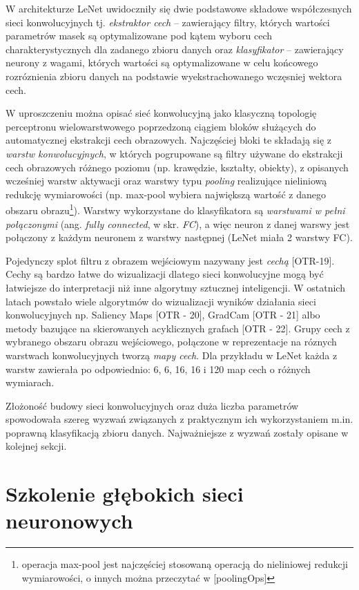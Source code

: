 W architekturze LeNet uwidoczniły się dwie podstawowe składowe współczesnych sieci konwolucyjnych tj. \textit{ekstraktor cech} -- zawierający filtry, których wartości parametrów masek są optymalizowane pod kątem wyboru cech charakterystycznych dla zadanego zbioru danych oraz \textit{klasyfikator} -- zawierający neurony z wagami, których wartości są optymalizowane w celu końcowego rozróznienia zbioru danych na podstawie wyekstrachowanego wczęsniej wektora cech. 

W uproszczeniu można opisać sieć konwolucyjną jako klasyczną topologię perceptronu wielowarstwowego poprzedzoną ciągiem bloków służących do automatycznej ekstrakcji cech obrazowych. Najczęściej bloki te składają się z \textit{warstw konwolucyjnych}, w których pogrupowane są filtry używane do ekstrakcji cech obrazowych różnego poziomu (np. krawędzie, kształty, obiekty), z opisanych wcześniej warstw aktywacji oraz warstwy typu \textit{pooling} realizujące nieliniową redukcję wymiarowości (np. max-pool wybiera największą wartość z danego obszaru obrazu\footnote{operacja max-pool jest najczęściej stosowaną operacją do nieliniowej redukcji wymiarowości, o innych można przeczytać w [poolingOps]}). Warstwy wykorzystane do klasyfikatora są \textit{warstwami w pełni połączonymi} (ang. \textit{fully connected}, w skr. \textit{FC}), a więc neuron z danej warswy jest połączony z każdym neuronem z warstwy następnej (LeNet miała 2 warstwy FC).

Pojedynczy splot filtru z obrazem wejściowym nazywany jest \textit{cechą} [OTR-19]. Cechy są bardzo łatwe do wizualizacji dlatego sieci konwolucyjne mogą być łatwiejsze do interpretacji niż inne algorytmy sztucznej inteligencji. W ostatnich latach powstało wiele algorytmów do wizualizacji wyników działania sieci konwolucyjnych np. Saliency Maps [OTR - 20], GradCam [OTR - 21] albo metody bazujące na skierowanych acyklicznych grafach [OTR - 22]. Grupy cech z wybranego obszaru obrazu wejściowego, połączone w reprezentacje na róznych warstwach konwolucyjnych tworzą \textit{mapy cech}. Dla przykładu w LeNet każda z warstw zawierała po odpowiednio: 6, 6, 16, 16 i 120 map cech o różnych wymiarach. 

Złożoność budowy sieci konwolucyjnych oraz duża liczba parametrów spowodowała szereg wyzwań związanych z praktycznym ich wykorzystaniem m.in. poprawną klasyfikacją zbioru danych. Najważniejsze z wyzwań zostały opisane w kolejnej sekcji.  

\section{Szkolenie głębokich sieci neuronowych}

